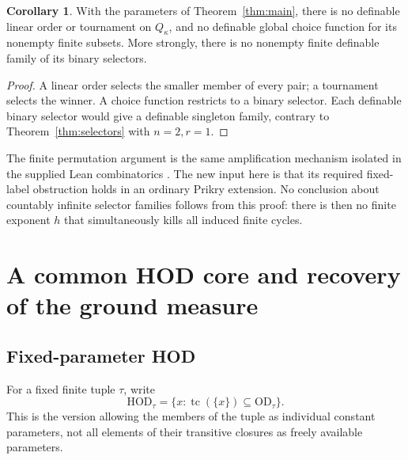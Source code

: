 \documentclass[11pt,letterpaper]{article}
\theoremstyle{definition}
\newtheorem{corollary}[definition]{Corollary}
\numberwithin{equation}{section}
\newcommand{\OD}{\mathrm{OD}}
\newcommand{\HOD}{\mathrm{HOD}}
\begin{document}
\begin{corollary}\label{cor:orders}
With the parameters of Theorem~\ref{thm:main}, there is no definable linear order or tournament on $Q_\kappa$, and no definable global choice function for its nonempty finite subsets. More strongly, there is no nonempty finite definable family of its binary selectors.
\end{corollary}
\begin{proof}
A linear order selects the smaller member of every pair; a tournament selects the winner. A choice function restricts to a binary selector. Each definable binary selector would give a definable singleton family, contrary to Theorem~\ref{thm:selectors} with $n=2,r=1$.
\end{proof}

The finite permutation argument is the same amplification mechanism isolated in the supplied Lean combinatorics \cite{lean}. The new input here is that its required fixed-label obstruction holds in an ordinary Prikry extension. No conclusion about countably infinite selector families follows from this proof: there is then no finite exponent $h$ that simultaneously kills all induced finite cycles.

\section{A common HOD core and recovery of the ground measure}\label{sec:core}

\subsection{Fixed-parameter HOD}

For a fixed finite tuple $\tau$, write
\[
 \HOD_\tau=\{x:\operatorname{tc}(\{x\})\subseteq\OD_\tau\}.
\]
This is the version allowing the members of the tuple as individual constant parameters, not all elements of their transitive closures as freely available parameters.
\end{document}
